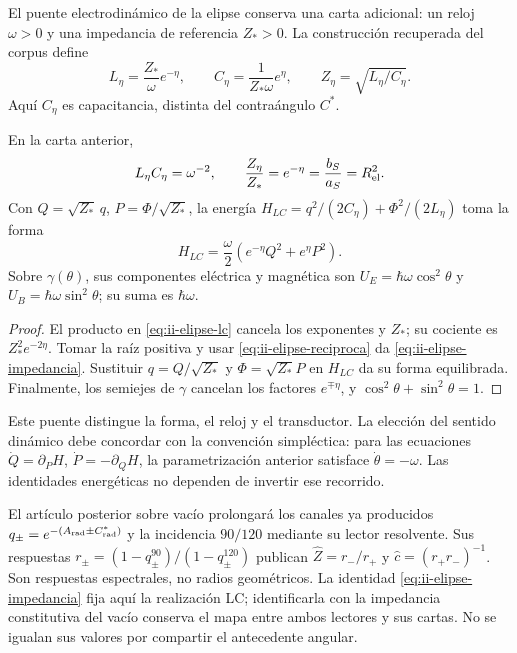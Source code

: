 El puente electrodinámico de la elipse conserva una carta adicional:
un reloj \(\omega>0\) y una impedancia de referencia \(Z_*>0\).
La construcción recuperada del corpus define
\begin{equation}
 L_\eta=\frac{Z_*}{\omega}e^{-\eta},\qquad
 C_\eta=\frac{1}{Z_*\omega}e^\eta,
 \qquad Z_\eta=\sqrt{L_\eta/C_\eta}.
 \label{eq:ii-elipse-lc}
\end{equation}
Aquí \(C_\eta\) es capacitancia, distinta del contraángulo \(C^*\).
\begin{proposition}
\label{prop:ii-elipse-lc}
En la carta anterior,
\begin{equation}
 L_\eta C_\eta=\omega^{-2},\qquad
 \frac{Z_\eta}{Z_*}=e^{-\eta}
 =\frac{b_S}{a_S}=R_{\rm el}^{2}.
 \label{eq:ii-elipse-impedancia}
\end{equation}
Con \(Q=\sqrt{Z_*}\,q\), \(P=\Phi/\sqrt{Z_*}\), la energía
\(H_{LC}=q^2/(2C_\eta)+\Phi^2/(2L_\eta)\) toma la forma
\[
 H_{LC}=\frac\omega2(e^{-\eta}Q^2+e^\eta P^2).
\]
Sobre \(\gamma(\theta)\), sus componentes eléctrica y magnética son
\(U_E=\hbar\omega\cos^2\theta\) y
\(U_B=\hbar\omega\sin^2\theta\); su suma es \(\hbar\omega\).
\end{proposition}
\begin{proof}
El producto en \eqref{eq:ii-elipse-lc} cancela los exponentes y
\(Z_*\); su cociente es \(Z_*^2e^{-2\eta}\). Tomar la raíz
positiva y usar \eqref{eq:ii-elipse-reciproca} da
\eqref{eq:ii-elipse-impedancia}. Sustituir \(q=Q/\sqrt{Z_*}\)
y \(\Phi=\sqrt{Z_*}P\) en \(H_{LC}\) da su forma equilibrada.
Finalmente, los semiejes de \(\gamma\) cancelan los factores
\(e^{\mp\eta}\), y \(\cos^2\theta+\sin^2\theta=1\).
\end{proof}

Este puente distingue la forma, el reloj y el transductor. La elección
del sentido dinámico debe concordar con la convención simpléctica: para
las ecuaciones \(\dot Q=\partial_PH\),
\(\dot P=-\partial_QH\), la parametrización anterior satisface
\(\dot\theta=-\omega\). Las identidades energéticas no dependen
de invertir ese recorrido.

El artículo posterior sobre vacío prolongará los canales ya producidos
\(q_\pm=e^{-(A_{\rm rad}\pm C^*_{\rm rad})}\) y la incidencia
\(90/120\) mediante su lector resolvente. Sus respuestas
\(r_\pm=(1-q_\pm^{90})/(1-q_\pm^{120})\) publican
\(\widehat Z=r_-/r_+\) y \(\widehat c=(r_+r_-)^{-1}\).
Son respuestas espectrales, no radios geométricos. La identidad
\eqref{eq:ii-elipse-impedancia} fija aquí la realización LC;
identificarla con la impedancia constitutiva del vacío conserva el mapa
entre ambos lectores y sus cartas. No se igualan sus valores por compartir
el antecedente angular.

